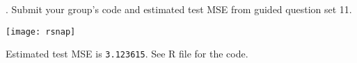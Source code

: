 \documentclass{article}
\begin{document}
\begin{flushleft}
. Submit your group’s code and estimated test MSE from guided question set 11.\newline

\begin{flushleft}
\texttt{[image: rsnap]}
\end{flushleft}
Estimated test MSE is \texttt{3.123615}. See R file for the code.

\end{flushleft}
\end{document}

